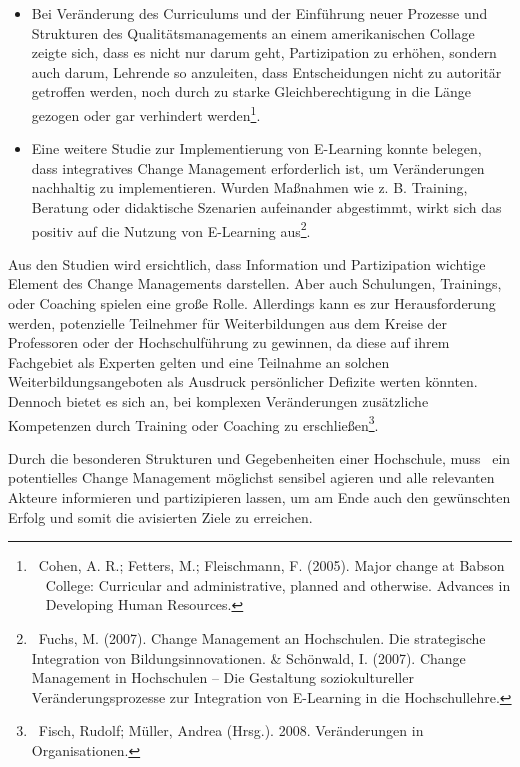 \documentclass{article}
\begin{document}
\bigskip

\begin{itemize}
\item Bei Veränderung des Curriculums und der Einführung neuer Prozesse und Strukturen des Qualitätsmanagements an einem
amerikanischen Collage zeigte sich, dass es nicht nur darum geht, Partizipation zu erhöhen, sondern auch darum,
Lehrende so anzuleiten, dass Entscheidungen nicht zu autoritär getroffen werden, noch durch zu starke
Gleichberechtigung in die Länge gezogen oder gar verhindert werden\footnote{\ Cohen, A. R.; Fetters, M.; Fleischmann,
F. (2005). Major change at Babson \ \ College: Curricular and administrative, planned and otherwise. Advances in
\ \ Developing Human Resources.}. 


\bigskip
\item Eine weitere Studie zur Implementierung von E-Learning konnte belegen, dass integratives Change Management
erforderlich ist, um Veränderungen nachhaltig zu implementieren. Wurden Maßnahmen wie z. B. Training, Beratung oder
didaktische Szenarien aufeinander abgestimmt, wirkt sich das positiv auf die Nutzung von E-Learning
aus\footnote{\ Fuchs, M. (2007). Change Management an Hochschulen. Die strategische Integration von
Bildungsinnovationen. \& Sch\"{o}nwald, I. (2007). Change Management in Hochschulen – Die Gestaltung soziokultureller
Ver\"{a}nderungsprozesse zur Integration von E-Learning in die Hochschullehre.}. 
\end{itemize}

\bigskip

Aus den Studien wird ersichtlich, dass Information und Partizipation wichtige Element des Change Managements darstellen.
Aber auch Schulungen, Trainings, oder Coaching spielen eine große Rolle. Allerdings kann es zur Herausforderung werden,
potenzielle Teilnehmer für Weiterbildungen aus dem Kreise der Professoren oder der Hochschulführung zu gewinnen, da
diese auf ihrem Fachgebiet als Experten gelten und eine Teilnahme an solchen Weiterbildungsangeboten als Ausdruck
persönlicher Defizite werten könnten. Dennoch bietet es sich an, bei komplexen Veränderungen zusätzliche Kompetenzen
durch Training oder Coaching zu erschließen\footnote{\ Fisch, Rudolf; Müller, Andrea (Hrsg.). 2008. Veränderungen in
Organisationen.}. 


\bigskip

Durch die besonderen Strukturen und Gegebenheiten einer Hochschule, muss \ ein potentielles Change Management möglichst
sensibel agieren und alle relevanten Akteure informieren und partizipieren lassen, um am Ende auch den gewünschten
Erfolg und somit die avisierten Ziele zu erreichen.
\end{document}
